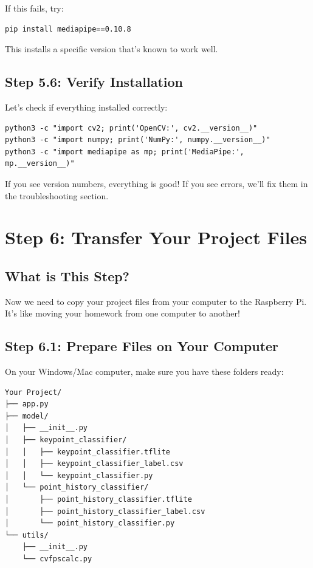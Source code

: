 \documentclass[12pt,a4paper]{article}
\begin{document}
\begin{tipbox}
If this fails, try:
\begin{lstlisting}
pip install mediapipe==0.10.8
\end{lstlisting}
This installs a specific version that's known to work well.
\end{tipbox}

\subsection{Step 5.6: Verify Installation}

Let's check if everything installed correctly:

\begin{lstlisting}
python3 -c "import cv2; print('OpenCV:', cv2.__version__)"
python3 -c "import numpy; print('NumPy:', numpy.__version__)"
python3 -c "import mediapipe as mp; print('MediaPipe:', mp.__version__)"
\end{lstlisting}

If you see version numbers, everything is good! If you see errors, we'll fix them in the troubleshooting section.

\section{Step 6: Transfer Your Project Files}

\subsection{What is This Step?}

Now we need to copy your project files from your computer to the Raspberry Pi. It's like moving your homework from one computer to another!

\subsection{Step 6.1: Prepare Files on Your Computer}

On your Windows/Mac computer, make sure you have these folders ready:

\begin{verbatim}
Your Project/
├── app.py
├── model/
│   ├── __init__.py
│   ├── keypoint_classifier/
│   │   ├── keypoint_classifier.tflite
│   │   ├── keypoint_classifier_label.csv
│   │   └── keypoint_classifier.py
│   └── point_history_classifier/
│       ├── point_history_classifier.tflite
│       ├── point_history_classifier_label.csv
│       └── point_history_classifier.py
└── utils/
    ├── __init__.py
    └── cvfpscalc.py
\end{verbatim}
\end{document}
